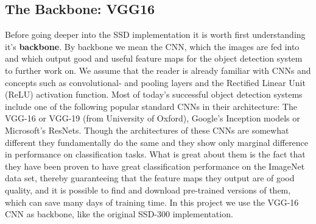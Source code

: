 \documentclass{article}
\begin{document}

\subsection{The Backbone: VGG16}
Before going deeper into the SSD implementation it is worth first understanding it's \textbf{backbone}. By backbone we mean the CNN, which the images are fed into and which output good and useful feature maps for the object detection system to further work on. We assume that the reader is already familiar with CNNs and concepts such as convolutional- and pooling layers and the Rectified Linear Unit (ReLU) activation function. 
Most of today's successful object detection systems include one of the following popular standard CNNs in their architecture: The VGG-16 or VGG-19 (from University of Oxford)\cite{VGG}, Google's Inception models\cite{googlenet} or Microsoft's ResNets\cite{resnet}. 
Though the architectures of these CNNs are somewhat different they fundamentally do the same and they show only marginal difference in performance on classification tasks. What is great about them is the fact that they have been proven to have great classification performance on the ImageNet data set, thereby guaranteeing that the feature maps they output are of good quality, and it is possible to find and download pre-trained versions of them, which can save many days of training time. In this project we use the VGG-16 CNN as backbone, like the original SSD-300 implementation.  
\end{document}
